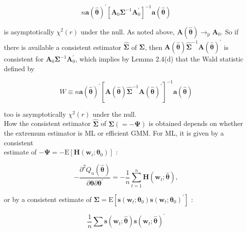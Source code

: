 \documentclass[10pt]{article}
\begin{document}
\begin{equation*}
n \mathbf{a}(\hat{\boldsymbol{\theta}})^{\prime}\left[\mathbf{A}_{0} \boldsymbol{\Sigma}^{-1} \mathbf{A}_{0}^{\prime}\right]^{-1} \mathbf{a}(\hat{\boldsymbol{\theta}}) \tag{7.4.10}
\end{equation*}


is asymptotically $\chi^{2}(r)$ under the null. As noted above, $\mathbf{A}(\hat{\boldsymbol{\theta}}) \rightarrow_{\mathrm{p}} \mathbf{A}_{0}$. So if there is available a consistent estimator $\widehat{\boldsymbol{\Sigma}}$ of $\boldsymbol{\Sigma}$, then $\mathbf{A}(\hat{\boldsymbol{\theta}}) \widehat{\boldsymbol{\Sigma}}^{-1} \mathbf{A}(\hat{\boldsymbol{\theta}})^{\prime}$ is consistent for $\mathbf{A}_{0} \boldsymbol{\Sigma}^{-1} \mathbf{A}_{0}^{\prime}$, which implies by Lemma 2.4(d) that the Wald statistic defined by


\begin{equation*}
W \equiv n \mathbf{a}(\hat{\boldsymbol{\theta}})^{\prime}\left[\mathbf{A}(\hat{\boldsymbol{\theta}}) \widehat{\mathbf{\Sigma}}^{-1} \mathbf{A}(\hat{\boldsymbol{\theta}})^{\prime}\right]^{-1} \mathbf{a}(\hat{\boldsymbol{\theta}}) \tag{7.4.11}
\end{equation*}


too is asymptotically $\chi^{2}(r)$ under the null.\\
How the consistent estimator $\widehat{\boldsymbol{\Sigma}}$ of $\boldsymbol{\Sigma}(=-\boldsymbol{\Psi})$ is obtained depends on whether the extremum estimator is ML or efficient GMM. For ML, it is given by a consistent\\
estimate of $-\boldsymbol{\Psi}=-\mathrm{E}\left[\mathbf{H}\left(\mathbf{w}_{i} ; \boldsymbol{\theta}_{0}\right)\right]$ :


\begin{equation*}
-\frac{\partial^{2} Q_{n}(\hat{\boldsymbol{\theta}})}{\partial \boldsymbol{\theta} \partial \boldsymbol{\theta}^{\prime}}=-\frac{1}{n} \sum_{t=1}^{n} \mathbf{H}\left(\mathbf{w}_{t} ; \hat{\boldsymbol{\theta}}\right), \tag{7.4.12}
\end{equation*}


or by a consistent estimate of $\boldsymbol{\Sigma}=\mathrm{E}\left[\mathbf{s}\left(\mathbf{w}_{t} ; \boldsymbol{\theta}_{0}\right) \mathbf{s}\left(\mathbf{w}_{t} ; \boldsymbol{\theta}_{0}\right)^{\prime}\right]$ :


\begin{equation*}
\frac{1}{n} \sum \mathbf{s}\left(\mathbf{w}_{t} ; \hat{\boldsymbol{\theta}}\right) \mathbf{s}\left(\mathbf{w}_{t} ; \hat{\boldsymbol{\theta}}\right)^{\prime} \tag{7.4.13}
\end{equation*}
\end{document}
